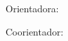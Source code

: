 \begin{center}
	\autum

	\autdos

	\auttre

	\autqua

\vspace*{8cm}

\MakeUppercase{\tit}\subtit

\vspace{1cm}
    
\hfill \normalsize {\parbox{8cm}{\footnotesize\linespread{1}\selectfont\nota
\vspace*{0.5cm}
    
Orientadora: \ori\par
Coorientador: \coori}}
\vfill

\loc\\
\data
\end{center}